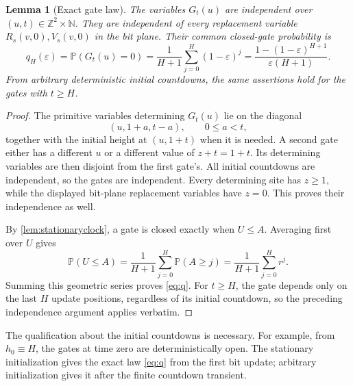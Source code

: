 \documentclass[11pt]{article}
\theoremstyle{plain}
\newtheorem{lemma}[theorem]{Lemma}
\theoremstyle{definition}
\theoremstyle{remark}
\newcommand{\Z}{\mathbb Z}
\newcommand{\N}{\mathbb N}
\newcommand{\Prob}{\mathbb P}
\newcommand{\eps}{\varepsilon}
\begin{document}
\begin{lemma}[Exact gate law]\label{lem:gates}
The variables $G_t(u)$ are independent over $(u,t)\in\Z^2\times\N$. They are independent of every replacement variable $R_s(v,0),V_s(v,0)$ in the bit plane. Their common closed-gate probability is
\begin{equation}\label{eq:q}
 q_H(\eps)=\Prob(G_t(u)=0)
 =\frac1{H+1}\sum_{j=0}^H(1-\eps)^j
 =\frac{1-(1-\eps)^{H+1}}{\eps(H+1)}.
\end{equation}
From arbitrary deterministic initial countdowns, the same assertions hold for the gates with $t\geq H$.
\end{lemma}
\begin{proof}
The primitive variables determining $G_t(u)$ lie on the diagonal
\[
 (u,1+a,t-a),\qquad 0\leq a<t,
\]
together with the initial height at $(u,1+t)$ when it is needed. A second gate either has a different $u$ or a different value of $z+t=1+t$. Its determining variables are then disjoint from the first gate's. All initial countdowns are independent, so the gates are independent. Every determining site has $z\geq1$, while the displayed bit-plane replacement variables have $z=0$. This proves their independence as well.

By \cref{lem:stationaryclock}, a gate is closed exactly when $U\leq A$. Averaging first over $U$ gives
\[
 \Prob(U\leq A)=\frac1{H+1}\sum_{j=0}^H\Prob(A\geq j)
 =\frac1{H+1}\sum_{j=0}^H r^j.
\]
Summing this geometric series proves \eqref{eq:q}. For $t\geq H$, the gate depends only on the last $H$ update positions, regardless of its initial countdown, so the preceding independence argument applies verbatim.
\end{proof}

The qualification about the initial countdowns is necessary. For example, from $h_0\equiv H$, the gates at time zero are deterministically open. The stationary initialization gives the exact law \eqref{eq:q} from the first bit update; arbitrary initialization gives it after the finite countdown transient.
\end{document}
